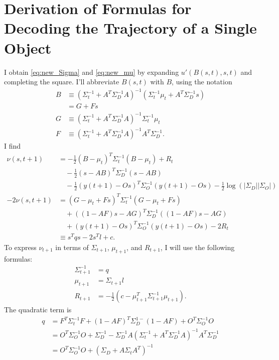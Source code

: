 \documentclass[12pt]{article}
\newcommand{\ti}[2]{{#1}{(#2)}}                         %
\newcommand{\logdet}{\log\left(\left|\Sigma_D\right| \left| \Sigma_O
    \right| \right)}
\begin{document}
\section{Derivation of Formulas for Decoding the Trajectory of a Single Object}
\label{app:decode}

I obtain \eqref{eq:new_Sigma} and \eqref{eq:new_mu} by expanding
$u'(B(s,t),s,t)$ and completing the square.  I'll abbreviate $B(s,t)$
with $B$, using the notation
\begin{align*}
  B &\equiv \left( \Sigma_t^{-1} + A^T \Sigma_D^{-1} A \right)^{-1}
  \left( \Sigma_t^{-1} \mu_t + A^T \Sigma_D^{-1} s \right) \\
  &= G + Fs \\
  G &\equiv \left( \Sigma_t^{-1} + A^T \Sigma_D^{-1} A \right)^{-1}
  \Sigma_t^{-1} \mu_t \\
  F &\equiv  \left( \Sigma_t^{-1} + A^T \Sigma_D^{-1} A \right)^{-1}
  A^T \Sigma_D^{-1}.
\end{align*}
I find
\begin{align*}
  \nu(s,t+1) &= -\frac{1}{2}(B-\mu_{t})^T \Sigma_{t}^{-1}
  (B-\mu_{t}) + R_t\\
  &\quad - \frac{1}{2} (s-AB)^T \Sigma_{D}^{-1} (s-AB)\\
  &\quad - \frac{1}{2}(\ti{y}{t+1}-O s)^T \Sigma_{O}^{-1}
  (\ti{y}{t+1}-Os) -\frac{1}{2} \logdet\\
  -2 \nu(s,t+1) &= (G-\mu_{t}+Fs)^T \Sigma_{t}^{-1} (G-\mu_{t}+Fs) \\
  &\quad + ((1-AF)s-AG)^T \Sigma_{D}^{-1} ((1-AF)s-AG)\\
  &\quad + (\ti{y}{t+1}-O s)^T \Sigma_{O}^{-1} (\ti{y}{t+1}-Os) -2R_t \\
  &\equiv s^T q s - 2s^T l + c.
\end{align*}
To express $\nu_{t+1}$ in terms of $\Sigma_{t+1}$, $\mu_{t+1}$, and
$R_{t+1}$, I will use the following formulas:
\begin{align*}
  \Sigma_{t+1}^{-1} &= q \\
  \mu_{t+1} &= \Sigma_{t+1} l \\
  R_{t+1} &= -\frac{1}{2} \left( c - \mu_{t+1}^T \Sigma_{t+1}^{-1}
    \mu_{t+1} \right) .
\end{align*}
The quadratic term is
\begin{align*}
  q &= F^T\Sigma_t^{-1}F + (1-AF)^T\Sigma_D^{1-}(1-AF) +
  O^T\Sigma_O^{-1}O \\
  &= O^T\Sigma_O^{-1}O + \Sigma_D^{-1} - \Sigma_D^{-1}A
  ( \Sigma_t^{-1} + A^T\Sigma_D^{-1}A )^{-1}A^T\Sigma_D^{-1}\\
  &= O^T\Sigma_O^{-1}O + (\Sigma_D + A \Sigma_t A^T)^{-1}
\end{align*}
\end{document}
